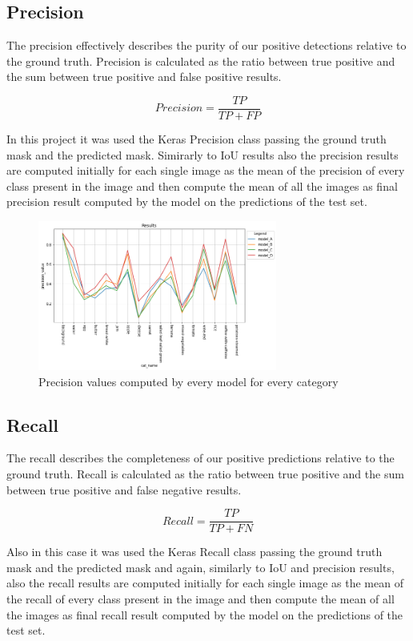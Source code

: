\documentclass[a4paper,10pt]{report}
\begin{document}
\clearpage\subsection{Precision}\label{subsec:subsection-512}

The precision effectively describes the purity of our positive detections relative to the ground truth. Precision is calculated as the ratio between true positive and the sum between true positive and false positive results. 


\[Precision = \frac{TP}{TP + FP}\]

In this project it was used the Keras Precision class passing the ground truth mask and the predicted mask.
Simirarly to IoU results also the precision results are computed initially for each single image as the mean of the precision of every class present in the image and then compute the mean of all the images as final precision result computed by the model on the predictions of the test set.

\begin{figure}[h]
    \centering
    \includegraphics[width=0.7\textwidth]{assets/img/cat_prec.png}
    \caption{Precision values computed by every model for every category}
    \label{fig:cat_prec}
\end{figure}

\clearpage\subsection{Recall}\label{subsec:subsection-513}
The recall describes the completeness of our positive predictions relative to the ground truth. Recall is calculated as the ratio between true positive and the sum between true positive and false negative results. 


\[Recall = \frac{TP}{TP + FN}\]

Also in this case it was used the Keras Recall class passing the ground truth mask and the predicted mask and again, similarly to IoU and precision results, also the recall results are computed initially for each single image as the mean of the recall of every class present in the image and then compute the mean of all the images as final recall result computed by the model on the predictions of the test set.
\end{document}

